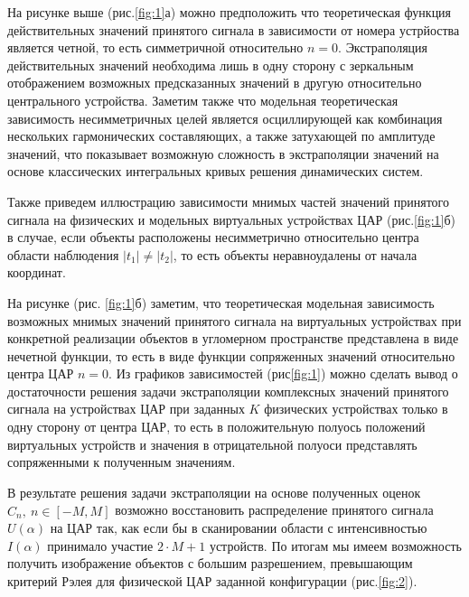 \documentclass{article}
\begin{document}
	На рисунке выше (рис.\ref{fig:1}а) можно предположить что теоретическая функция действительных значений принятого сигнала в зависимости от номера устрйоства является четной, то есть симметричной относительно $n=0$. Экстраполяция действительных значений необходима лишь в одну сторону с зеркальным отображением возможных предсказанных значений в другую относительно центрального устройства. Заметим также что модельная теоретическая зависимость несимметричных целей является осциллирующей как комбинация нескольких гармонических составляющих, а также затухающей по амплитуде значений, что показывает возможную сложность в экстраполяции значений на основе классических интегральных кривых решения динамических систем.
	
	Также приведем иллюстрацию зависимости мнимых частей значений принятого сигнала на физических и модельных виртуальных устройствах ЦАР (рис.\ref{fig:1}б) в случае, если объекты расположены несимметрично относительно центра области наблюдения $|t_1| \ne |t_2|$, то есть объекты неравноудалены от начала координат.
		
	На рисунке (рис. \ref{fig:1}б) заметим, что теоретическая модельная зависимость возможных мнимых значений принятого сигнала на виртуальных устройствах при конкретной реализации объектов в угломерном пространстве представлена в виде нечетной функции, то есть в виде функции сопряженных значений относительно центра ЦАР $n = 0$. Из графиков зависимостей (рис\ref{fig:1}) можно сделать вывод о достаточности решения задачи экстраполяции комплексных значений принятого сигнала на устройствах ЦАР при заданных $K$ физических устройствах только в одну сторону от центра ЦАР, то есть в положительную полуось положений виртуальных устройств и значения в отрицательной полуоси представлять сопряженными к полученным значениям.
	
	В результате решения задачи экстраполяции на основе полученных оценок $\hat{C}_n,\ n\in [-M, M]$ возможно восстановить распределение принятого сигнала $U(\alpha)$ на ЦАР так, как если бы в сканировании области с интенсивностью $I(\alpha)$ принимало участие $2\cdot M + 1$ устройств. По итогам мы имеем возможность получить изображение объектов с большим разрешением, превышающим критерий Рэлея для физической ЦАР заданной конфигурации (рис.\ref{fig:2}).
	
\end{document}
